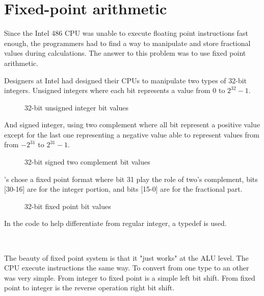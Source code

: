 \section{Fixed-point arithmetic}
Since the Intel 486 CPU was unable to execute floating point instructions fast enough, the programmers had to find a way to manipulate and store fractional values during calculations. The answer to this problem was to use fixed point arithmetic.\\
\par
Designers at Intel had designed their CPUs to manipulate two types of 32-bit integers. Unsigned integers where each bit represents a value from $0$ to $2^{32}-1$.\\
\par
\begin{figure}[H]
 \centering
  
 \caption{32-bit unsigned integer bit values} 
\end{figure}
\par
And signed integer, using two complement where all bit represent a positive value except for the last one representing a negative value able to represent values from from $-2^{31}$ to $2^{31}-1$.\\
\par
\begin{figure}[H]
 \centering
  
 \caption{32-bit signed two complement bit values} 
\end{figure}
\par


\doom's chose a fixed point format  where bit 31 play the role of two's complement, bits [30-16] are for the integer portion, and bits [15-0] are for the fractional part.\\
\par
\begin{figure}[H]
 \centering
  
  \caption{32-bit \doom fixed point bit values}
\end{figure}
\par 
In the code to help differentiate from regular integer, a typedef  is used.\\
\par
{}\\
\par
The beauty of fixed point system is that it "just works" at the ALU level. The CPU execute instructions the same way. To convert from one type to an other was very simple. From integer to fixed point is a simple  left bit shift. From fixed point to integer is the reverse operation  right bit shift.\\



